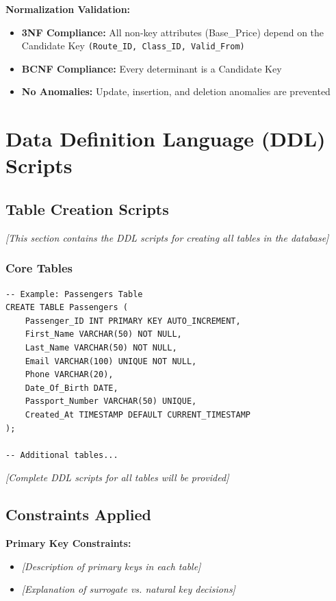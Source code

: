 \documentclass[12pt,a4paper,openany]{report}
\begin{document}
\textbf{Normalization Validation:}
\begin{itemize}
    \item \textbf{3NF Compliance:} All non-key attributes (Base\_Price) depend on the Candidate Key \texttt{(Route\_ID, Class\_ID, Valid\_From)}
    \item \textbf{BCNF Compliance:} Every determinant is a Candidate Key
    \item \textbf{No Anomalies:} Update, insertion, and deletion anomalies are prevented
\end{itemize}

\section{Data Definition Language (DDL) Scripts}

\subsection{Table Creation Scripts}

\textit{[This section contains the DDL scripts for creating all tables in the database]}

\subsubsection{Core Tables}

\begin{lstlisting}[caption={Sample DDL Script - Tables Creation}]
-- Example: Passengers Table
CREATE TABLE Passengers (
    Passenger_ID INT PRIMARY KEY AUTO_INCREMENT,
    First_Name VARCHAR(50) NOT NULL,
    Last_Name VARCHAR(50) NOT NULL,
    Email VARCHAR(100) UNIQUE NOT NULL,
    Phone VARCHAR(20),
    Date_Of_Birth DATE,
    Passport_Number VARCHAR(50) UNIQUE,
    Created_At TIMESTAMP DEFAULT CURRENT_TIMESTAMP
);

-- Additional tables...
\end{lstlisting}

\textit{[Complete DDL scripts for all tables will be provided]}

\subsection{Constraints Applied}

\textbf{Primary Key Constraints:}
\begin{itemize}
    \item \textit{[Description of primary keys in each table]}
    \item \textit{[Explanation of surrogate vs. natural key decisions]}
\end{itemize}
\end{document}
